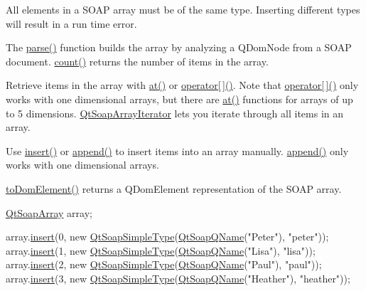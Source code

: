 All elements in a S\+O\+AP array must be of the same type. Inserting different types will result in a run time error.

The \mbox{\hyperlink{class_qt_soap_array_a203a7b3fbe4a98c6cd997fe0fcebb4c3}{parse()}} function builds the array by analyzing a Q\+Dom\+Node from a S\+O\+AP document. \mbox{\hyperlink{class_qt_soap_array_a5cf3ee6dc1faf7198be24fcfdf0e3bb8}{count()}} returns the number of items in the array.

Retrieve items in the array with \mbox{\hyperlink{class_qt_soap_array_a97d6e3695d7cd56dc60c52a492f653a9}{at()}} or \mbox{\hyperlink{class_qt_soap_array_a52701f0a8b5554e9cd51675d6b86ed00}{operator\mbox{[}$\,$\mbox{]}()}}. Note that \mbox{\hyperlink{class_qt_soap_array_a52701f0a8b5554e9cd51675d6b86ed00}{operator\mbox{[}$\,$\mbox{]}()}} only works with one dimensional arrays, but there are \mbox{\hyperlink{class_qt_soap_array_a97d6e3695d7cd56dc60c52a492f653a9}{at()}} functions for arrays of up to 5 dimensions. \mbox{\hyperlink{class_qt_soap_array_iterator}{Qt\+Soap\+Array\+Iterator}} lets you iterate through all items in an array.

Use \mbox{\hyperlink{class_qt_soap_array_a7be8113dc4c686e1ea243b988269f50d}{insert()}} or \mbox{\hyperlink{class_qt_soap_array_a52d39a5ffe682ccb5c9196654136fe96}{append()}} to insert items into an array manually. \mbox{\hyperlink{class_qt_soap_array_a52d39a5ffe682ccb5c9196654136fe96}{append()}} only works with one dimensional arrays.

\mbox{\hyperlink{class_qt_soap_array_afd48e465aad1088003c1cc7024b99e81}{to\+Dom\+Element()}} returns a Q\+Dom\+Element representation of the S\+O\+AP array.


\begin{DoxyCode}
\mbox{\hyperlink{class_qt_soap_array}{QtSoapArray}} array;

array.\mbox{\hyperlink{class_qt_soap_array_a7be8113dc4c686e1ea243b988269f50d}{insert}}(0, \textcolor{keyword}{new} \mbox{\hyperlink{class_qt_soap_simple_type}{QtSoapSimpleType}}(\mbox{\hyperlink{class_qt_soap_q_name}{QtSoapQName}}(\textcolor{stringliteral}{"Peter"}), \textcolor{stringliteral}{"peter"}));
array.\mbox{\hyperlink{class_qt_soap_array_a7be8113dc4c686e1ea243b988269f50d}{insert}}(1, \textcolor{keyword}{new} \mbox{\hyperlink{class_qt_soap_simple_type}{QtSoapSimpleType}}(\mbox{\hyperlink{class_qt_soap_q_name}{QtSoapQName}}(\textcolor{stringliteral}{"Lisa"}), \textcolor{stringliteral}{"lisa"}));
array.\mbox{\hyperlink{class_qt_soap_array_a7be8113dc4c686e1ea243b988269f50d}{insert}}(2, \textcolor{keyword}{new} \mbox{\hyperlink{class_qt_soap_simple_type}{QtSoapSimpleType}}(\mbox{\hyperlink{class_qt_soap_q_name}{QtSoapQName}}(\textcolor{stringliteral}{"Paul"}), \textcolor{stringliteral}{"paul"}));
array.\mbox{\hyperlink{class_qt_soap_array_a7be8113dc4c686e1ea243b988269f50d}{insert}}(3, \textcolor{keyword}{new} \mbox{\hyperlink{class_qt_soap_simple_type}{QtSoapSimpleType}}(\mbox{\hyperlink{class_qt_soap_q_name}{QtSoapQName}}(\textcolor{stringliteral}{"Heather"}), \textcolor{stringliteral}{"heather"}));
\end{DoxyCode}


